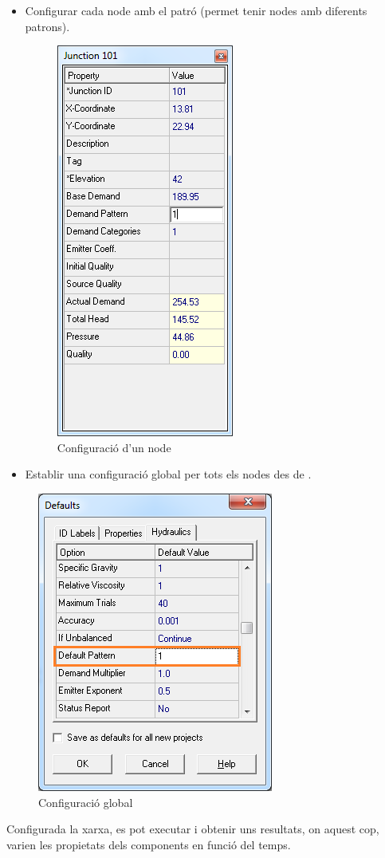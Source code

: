 \documentclass[12pt]{article}
\begin{document}
\begin{itemize}
	\item Configurar cada node amb el patró (permet tenir nodes amb diferents patrons).
\begin{figure}[h!]
	\centering
	\includegraphics[scale=.5]{imatges/epanet/18.png}
	\caption{Configuració d'un node}
	\label{fig:confNodeAnode}
\end{figure}
	\item Establir una configuració global per tots els nodes des de .
\end{itemize}
\begin{figure}[h!]
	\centering
	\includegraphics[scale=.5]{imatges/epanet/19.png}
	\caption{Configuració global}
	\label{fig:confGlobal}
\end{figure}
Configurada la xarxa, es pot executar i obtenir uns resultats, on aquest cop, varien les propietats dels components en funció del temps.
\end{document}
